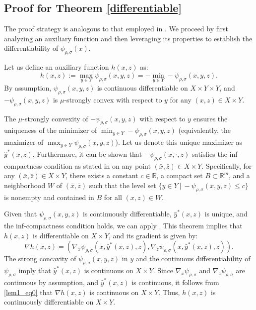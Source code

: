 \documentclass{article}
\begin{document}
\subsection{Proof for Theorem \ref{differentiable}}\label{differentiableproof}

The proof strategy is analogous to that employed in \cite[Lemma A.1]{yaoconstrained}. We proceed by first analyzing an auxiliary function and then leveraging its properties to establish the differentiability of $\phi_{\rho,\sigma}(x)$.

Let us define an auxiliary function $h(x,z)$ as:	$$h(x,z) := \max_{y \in Y} \psi_{\rho,\sigma}(x,y,z) = - \min_{y \in Y} - \psi_{\rho,\sigma}(x,y,z). $$
	By assumption, $\psi_{\rho,\sigma}(x,y,z)$ is continuous differentiable on $X \times Y \times Y$, and $- \psi_{\rho,\sigma}(x,y,z)$ is $\mu$-strongly convex with respect to $y$ for any $(x,z) \in X \times Y$. 

The $\mu$-strongly convexity of $- \psi_{\rho,\sigma}(x,y,z)$ with respect to $y$ ensures the uniqueness of the minimizer of $\min_{y \in Y} - \psi_{\rho,\sigma}(x,y,z)$ (equivalently, the maximizer of $\max_{y \in Y} \psi_{\rho,\sigma}(x,y,z)$). Let us denote this unique maximizer as  
$\widehat{y}^*(x,z)$.
    Furthermore, it can be shown that $- \psi_{\rho,\sigma}(x, \cdot ,z)$ satisfies the inf-compactness condition as stated in \cite[Theorem 4.13]{bonnans2013perturbation} on any point $(\bar{x},\bar{z}) \in X \times Y $. 
	Specifically, for any $(\bar{x},\bar{z}) \in X \times Y $, there exists a constant $c \in \mathbb{R}$, a compact set $B \subset \mathbb{R}^m$, and a neighborhood $W$ of $(\bar{x},\bar{z})$ such that the level set $\{ y \in Y ~|~ - \psi_{\rho,\sigma}(x,y,z) \le c \}$ is nonempty and contained in $B$ for all $(x, z) \in W$.

Given that $\psi_{\rho,\sigma}(x,y,z)$ is continuously differentiable, $\widehat{y}^*(x,z)$ is unique, and the inf-compactness condition holds, we can apply \cite[Theorem 4.13, Remark 4.14]{bonnans2013perturbation}. This theorem implies that $h(x,z)$ is differentiable on $X \times Y $, and its gradient is given by:
	\begin{equation}\label{lem1_eq0}
		\nabla h(x,z) = 
		\left(  
		\nabla_x \psi_{\rho,\sigma}(x,\widehat{y}^*(x,z),z), \nabla_z \psi_{\rho,\sigma}(x,\widehat{y}^*(x,z),z)
		\right).
	\end{equation}
The strong concavity of $\psi_{\rho,\sigma}(x,y,z)$ in $y$ and the continuous differentiability of $\psi_{\rho,\sigma}$ imply that $\widehat{y}^*(x,z)$ is continuous on $X \times Y$. Since $\nabla_x\psi_{\rho,\sigma}$ and $\nabla_z\psi_{\rho,\sigma}$ are continuous by assumption, and  $\widehat{y}^*(x,z)$ is continuous, it follows from \eqref{lem1_eq0} that $\nabla h(x,z)$ is continuous on $X \times Y$. Thus, $h(x,z)$ is continuously differentiable on $X \times Y$.
	
\end{document}
